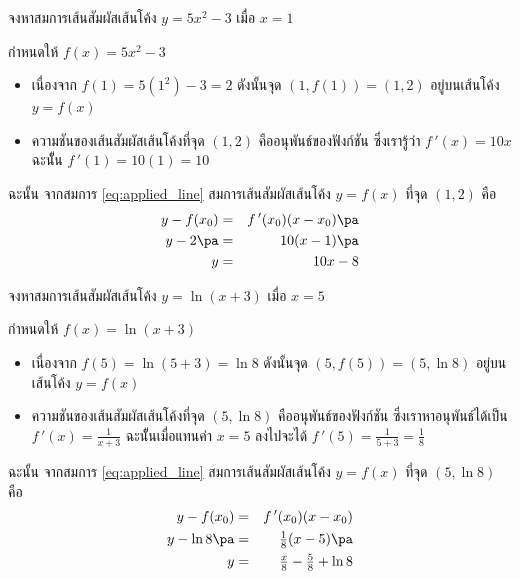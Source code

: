 \begin{frame}[t]
\begin{ex}
จงหาสมการเส้นสัมผัสเส้นโค้ง $y = 5x^2 - 3$ เมื่อ $x=1$
\end{ex}
\begin{sol} กำหนดให้ $f(x) = 5x^2-3$
\begin{itemize}
\item เนื่องจาก $f(1) = 5(1^2) - 3 = 2$ \pa ดังนั้นจุด $(1, f(1)) = (1,2)$ อยู่บนเส้นโค้ง $y = f(x)$ \pa
\item ความชันของเส้นสัมผัสเส้นโค้งที่จุด $(1, 2)$ คืออนุพันธ์ของฟังก์ชัน \pa ซึ่งเรารู้ว่า $f\,'(x) = 10x$ \pa ฉะนัั้น $f\,'(1) = 10(1) = 10$ \pa
\end{itemize}
ฉะนั้น จากสมการ \eqref{eq:applied_line} สมการเส้นสัมผัสเส้นโค้ง $y = f(x)$ ที่จุด $(1,2)$ คือ \pa
\begin{eqnarray*}
y - f(x_0) &=& f\,'(x_0) (x-x_0) \pa \\
y - 2 \pa &=& 10(x-1) \pa \\
y &=& 10x-8
\end{eqnarray*}
\end{sol}
\end{frame}

\begin{frame}
\end{frame}


\begin{frame}[t]
\begin{ex}
จงหาสมการเส้นสัมผัสเส้นโค้ง $y = \ln (x+3)$ เมื่อ $x=5$
\end{ex}
\begin{sol} กำหนดให้ $f(x) = \ln (x+3)$
\begin{itemize}
\item เนื่องจาก $f(5) = \ln (5+3) = \ln 8$ \pa ดังนั้นจุด $(5, f(5)) = (5, \ln 8)$ อยู่บนเส้นโค้ง $y = f(x)$ \pa
\item ความชันของเส้นสัมผัสเส้นโค้งที่จุด $(5,\ln 8)$ คืออนุพันธ์ของฟังก์ชัน \pa ซึ่งเราหาอนุพันธ์ได้เป็น $f\,'(x) = \tfrac{1}{x+3}$ \pa ฉะนัั้นเมื่อแทนค่า $x=5$ ลงไปจะได้ $f\,'(5) = \tfrac{1}{5+3} = \tfrac{1}{8}$ \pa
\end{itemize}
ฉะนั้น จากสมการ \eqref{eq:applied_line} สมการเส้นสัมผัสเส้นโค้ง $y = f(x)$ ที่จุด $(5, \ln 8)$ คือ \pa
\begin{eqnarray*}
y - f(x_0) &=& f\,'(x_0) (x-x_0) \\
y - \ln 8 \pa &=& \tfrac{1}{8}(x - 5) \pa \\
y &=& \tfrac{x}{8} - \tfrac{5}{8} + \ln 8
\end{eqnarray*}
\end{sol}
\end{frame}

